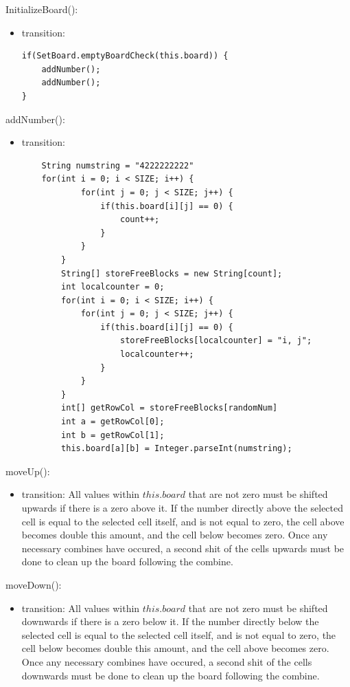 \documentclass[12pt]{article}
\begin{document}
\noindent InitializeBoard():
\begin{itemize}
\item transition: 
\begin{lstlisting}
if(SetBoard.emptyBoardCheck(this.board)) {
	addNumber();
	addNumber();
}
\end{lstlisting}
\end{itemize}

\noindent addNumber():
\begin{itemize}
\item transition: 
\begin{lstlisting}
	String numstring = "4222222222"
	for(int i = 0; i < SIZE; i++) {
            for(int j = 0; j < SIZE; j++) {
                if(this.board[i][j] == 0) {
                    count++;
                }
            }
        }
        String[] storeFreeBlocks = new String[count];
        int localcounter = 0;
        for(int i = 0; i < SIZE; i++) {
            for(int j = 0; j < SIZE; j++) {
                if(this.board[i][j] == 0) {
                    storeFreeBlocks[localcounter] = "i, j";
                    localcounter++;
                }
            }
        }
        int[] getRowCol = storeFreeBlocks[randomNum]
        int a = getRowCol[0];
        int b = getRowCol[1];
        this.board[a][b] = Integer.parseInt(numstring);
\end{lstlisting}
\end{itemize}

\noindent moveUp():
\begin{itemize}
\item transition: All values within $this.board$ that are not zero must be shifted upwards if there is a zero above it. If the number directly above the selected cell is equal to the selected cell itself, and is not equal to zero, the cell above becomes double this amount, and the cell below becomes zero. Once any necessary combines have occured, a second shit of the cells upwards must be done to clean up the board following the combine.
\end{itemize}

\noindent moveDown():
\begin{itemize}
\item transition: All values within $this.board$ that are not zero must be shifted downwards if there is a zero below it. If the number directly below the selected cell is equal to the selected cell itself, and is not equal to zero, the cell below becomes double this amount, and the cell above becomes zero. Once any necessary combines have occured, a second shit of the cells downwards must be done to clean up the board following the combine.
\end{itemize}
\end{document}
